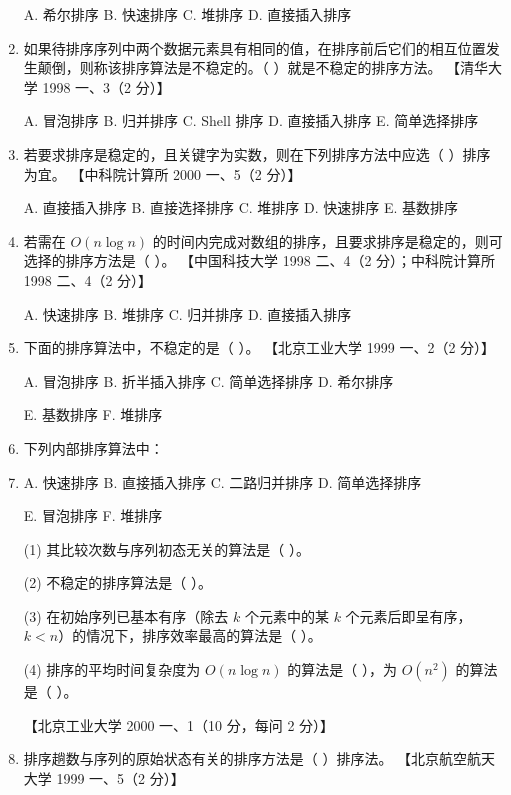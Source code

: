 \documentclass[lang=cn,newtx,10pt,scheme=chinese]{../../elegantbook}
\begin{document}
\begin{enumerate}
    A. 希尔排序 \quad B. 快速排序 \quad C. 堆排序 \quad D. 直接插入排序  

    \item 如果待排序序列中两个数据元素具有相同的值，在排序前后它们的相互位置发生颠倒，则称该排序算法是不稳定的。（ ）就是不稳定的排序方法。  
    【清华大学 1998 一、3（2 分）】  

    A. 冒泡排序 \quad B. 归并排序 \quad C. Shell 排序 \quad D. 直接插入排序 \quad E. 简单选择排序  

    \item 若要求排序是稳定的，且关键字为实数，则在下列排序方法中应选（ ）排序为宜。  
    【中科院计算所 2000 一、5（2 分）】  

    A. 直接插入排序 \quad B. 直接选择排序 \quad C. 堆排序 \quad D. 快速排序 \quad E. 基数排序  

    \item 若需在 $O(n \log n)$ 的时间内完成对数组的排序，且要求排序是稳定的，则可选择的排序方法是（ ）。  
    【中国科技大学 1998 二、4（2 分）；中科院计算所 1998 二、4（2 分）】  

    A. 快速排序 \quad B. 堆排序 \quad C. 归并排序 \quad D. 直接插入排序  

    \item 下面的排序算法中，不稳定的是（ ）。  
    【北京工业大学 1999 一、2（2 分）】  

    A. 冒泡排序 \quad B. 折半插入排序 \quad C. 简单选择排序 \quad D. 希尔排序  

    E. 基数排序 \quad F. 堆排序  

    \item 下列内部排序算法中：  
    \item 
    A. 快速排序 \quad B. 直接插入排序 \quad C. 二路归并排序 \quad D. 简单选择排序  

    E. 冒泡排序 \quad F. 堆排序  

    (1) 其比较次数与序列初态无关的算法是（ ）。 

    (2) 不稳定的排序算法是（ ）。  

    (3) 在初始序列已基本有序（除去 $k$ 个元素中的某 $k$ 个元素后即呈有序，$k < n$）的情况下，排序效率最高的算法是（ ）。  

    (4) 排序的平均时间复杂度为 $O(n \log n)$ 的算法是（ ），为 $O(n^2)$ 的算法是（ ）。  

    【北京工业大学 2000 一、1（10 分，每问 2 分）】  

    \item 排序趟数与序列的原始状态有关的排序方法是（ ）排序法。  
    【北京航空航天大学 1999 一、5（2 分）】  


\end{enumerate}
\end{document}
